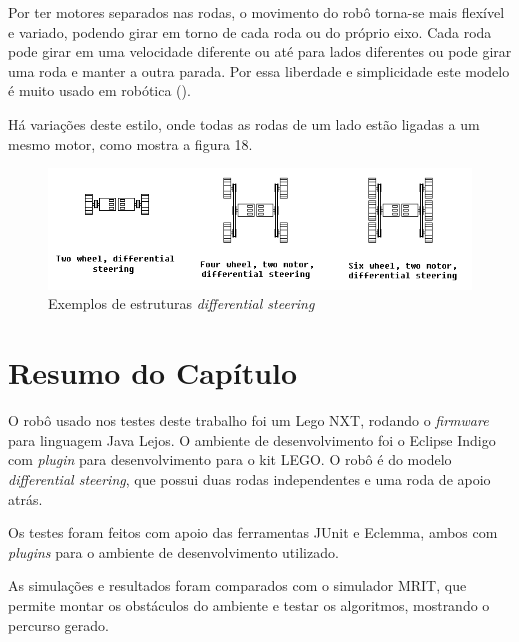 Por ter motores separados nas rodas, o movimento do robô torna-se mais flexível e variado, podendo girar em torno de cada roda ou do próprio eixo. Cada roda pode girar em uma velocidade diferente ou até para lados diferentes ou pode girar uma roda e manter a outra parada. Por essa liberdade e simplicidade este modelo é muito usado em robótica (\cite{Mataric2007}).

Há variações deste estilo, onde todas as rodas de um lado estão ligadas a um mesmo motor, como mostra a figura 18.

\begin{figure}[h]
	\centering
	\label{fig18}
		\includegraphics[keepaspectratio=true,scale=0.9]{figuras/3differentialSteering.png}
	\caption{Exemplos de estruturas \textit{differential steering} \cite{IMG_DIFFERENTIAL_STEERING_SITE}}
\end{figure}

\section{Resumo do Capítulo}

O robô usado nos testes deste trabalho foi um Lego NXT, rodando o \textit{firmware} para linguagem Java Lejos. O ambiente de desenvolvimento foi o Eclipse Indigo com \textit{plugin} para desenvolvimento para o kit LEGO. O robô é do modelo \textit{differential steering}, que possui duas rodas independentes e uma roda de apoio atrás.

Os testes foram feitos com apoio das ferramentas JUnit e Eclemma, ambos com \textit{plugins} para o ambiente de desenvolvimento utilizado.

As simulações e resultados foram comparados com o simulador MRIT, que permite montar os obstáculos do ambiente e testar os algoritmos, mostrando o percurso gerado.